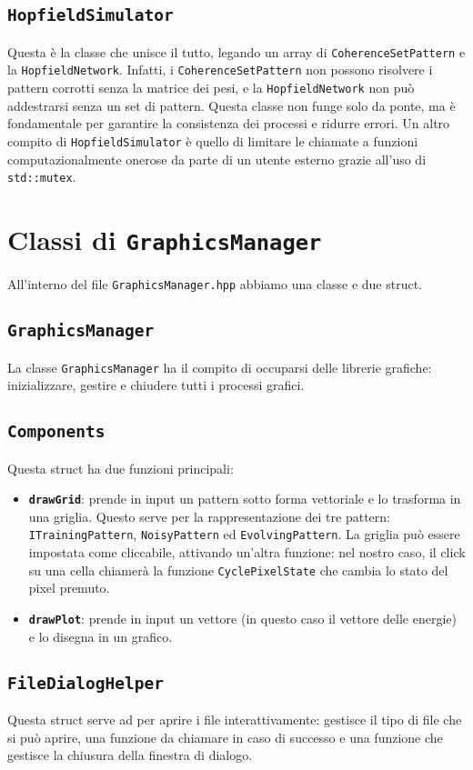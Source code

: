 \documentclass{article}
\begin{document}
\subsection{\texttt{HopfieldSimulator}}
Questa è la classe che unisce il tutto, legando un array di \texttt{CoherenceSetPattern} e la \texttt{HopfieldNetwork}. Infatti, i \texttt{CoherenceSetPattern} non possono risolvere i pattern corrotti senza la matrice dei pesi, e la \texttt{HopfieldNetwork} non può addestrarsi senza un set di pattern. Questa classe non funge solo da ponte, ma è fondamentale per garantire la consistenza dei processi e ridurre errori. Un altro compito di \texttt{HopfieldSimulator} è quello di limitare le chiamate a funzioni computazionalmente onerose da parte di un utente esterno grazie all'uso di \texttt{std::mutex}.

\section{Classi di \texttt{GraphicsManager}}
All'interno del file \texttt{GraphicsManager.hpp} abbiamo una classe e due struct.
\subsection{\texttt{GraphicsManager}}
La classe \texttt{GraphicsManager} ha il compito di occuparsi delle librerie grafiche: inizializzare, gestire e chiudere tutti i processi grafici. 

\subsection{\texttt{Components}}
Questa struct ha due funzioni principali:
\begin{itemize}
    \item \textbf{\texttt{drawGrid}}: prende in input un pattern sotto forma vettoriale e lo trasforma in una griglia. Questo serve per la rappresentazione dei tre pattern: \texttt{ITrainingPattern}, \texttt{NoisyPattern} ed \texttt{EvolvingPattern}. La griglia può essere impostata come cliccabile, attivando un'altra funzione: nel nostro caso, il click su una cella chiamerà la funzione \texttt{CyclePixelState} che cambia lo stato del pixel premuto.  
    \item \textbf{\texttt{drawPlot}}: prende in input un vettore (in questo caso il vettore delle energie) e lo disegna in un grafico.
\end{itemize}

\subsection{\texttt{FileDialogHelper}}
Questa struct serve ad per aprire i file interattivamente: gestisce il tipo di file che si può aprire, una funzione da chiamare in caso di successo e una funzione che gestisce la chiusura della finestra di dialogo.
\end{document}

